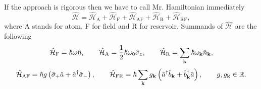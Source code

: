 If the approach is rigorous then we have to call Mr. Hamiltonian immediately
\begin{equation}
	\hat{\mathcal{H}} = \hat{\mathcal{H}}_{\text{A}} + \hat{\mathcal{H}}_{\text{F}} + \hat{\mathcal{H}}_{\text{AF}} + \hat{\mathcal{H}}_{\text{R}} + \hat{\mathcal{H}}_{\text{RF}},
\end{equation}
where A stands for atom, F for field and R for reservoir. Summands of $\hat{\mathcal{H}}$ are the following
\begin{equation}
	\hat{\mathcal{H}}_{\text{F}} = \hbar \omega \hat{n}, \qquad \hat{\mathcal{H}}_{\text{A}} = \frac{1}{2} \hbar \omega_0 \hat{\sigma}_z, \qquad \hat{\mathcal{H}}_{\text{R}} = \sum_{\mathbf{k}} \hbar \omega_{\mathbf{k}} \hat{n}_{\mathbf{k}},
\end{equation}
\begin{equation}
	\hat{\mathcal{H}}_{\text{AF}} = \hbar g \left( \hat{\sigma}_+ \hat{a} + \hat{a}^{\dagger} \hat{\sigma}_- \right),  \qquad \hat{\mathcal{H}}_{\text{FR}} = \hbar \sum_{\mathbf{k}} g_{\mathbf{k}} \left( \hat{a}^{\dagger} \hat{b}_{\mathbf{k}} +  \hat{b}^{\dagger}_{\mathbf{k}} \hat{a} \right), \qquad 
	g, g_{\mathbf{k}} \in \mathbb{R}.
\end{equation}

